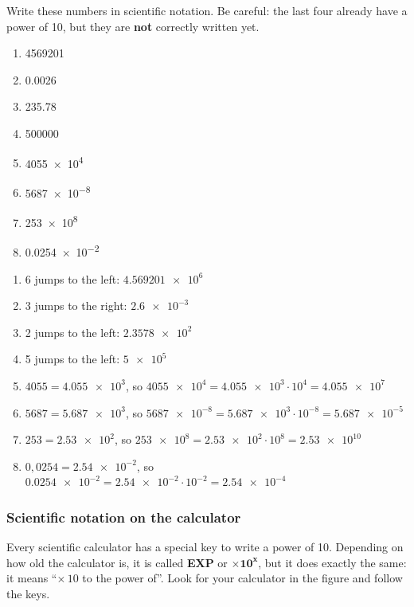 \begin{exercise}
    Write these numbers in scientific notation. Be careful: the last four already have a power of 10, but they are \textbf{not} correctly written yet.
    \begin{enumerate}[label=\letraminuscula]
        \item \num{4569201}
        \item \num{0.0026}
        \item \num{235.78}
        \item \num{500000}
        \item \num{4055e4}
        \item \num{5687e-8}
        \item \num{253e8}
        \item \num{0.0254e-2}
    \end{enumerate}
    \begin{solu}
        \begin{enumerate}[label=\alph*)]
            \item 6 jumps to the left: \(\num{4.569201e6}\)
            \item 3 jumps to the right: \(\num{2.6e-3}\)
            \item 2 jumps to the left: \(\num{2.3578e2}\)
            \item 5 jumps to the left: \(\num{5e5}\)
            \item \(4055 = \num{4.055e3}\), so \(\num{4055e4} = \num{4.055e3} \cdot 10^{4} = \num{4.055e7}\)
            \item \(5687 = \num{5.687e3}\), so \(\num{5687e-8} = \num{5.687e3} \cdot 10^{-8} = \num{5.687e-5}\)
            \item \(253 = \num{2.53e2}\), so \(\num{253e8} = \num{2.53e2} \cdot 10^{8} = \num{2.53e10}\)
            \item \(0{,}0254 = \num{2.54e-2}\), so \(\num{0.0254e-2} = \num{2.54e-2} \cdot 10^{-2} = \num{2.54e-4}\)
        \end{enumerate}
    \end{solu}
\end{exercise}


\subsubsection{Scientific notation on the calculator}

Every scientific calculator has a special key to write a power of 10. Depending on how old the calculator is, it is called \textbf{EXP} or \(\boldsymbol{\times 10^{x}}\), but it does exactly the same: it means ``\(\times\,10\) to the power of''. Look for your calculator in the figure and follow the keys.

